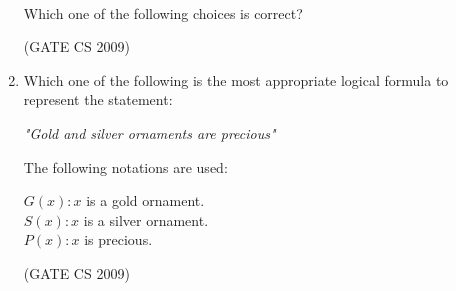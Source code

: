 \documentclass[a4paper, 11pt]{article}
\begin{document}
\begin{enumerate}
\begin{tabular}{c|cccc}
    \end{tabular}\\
    Which one of the following choices is correct?
    \begin{enumerate}
    \end{enumerate}

    \hfill (GATE CS 2009)

    \item Which one of the following is the most appropriate logical formula to represent the statement:\\
    \begin{center}
        \textit{"Gold and silver ornaments are precious"}\\
    \end{center}
    The following notations are used:\\
        \begin{center}
            $G(x): x$ is a gold ornament.\\
            $S(x): x$ is a silver ornament. \\
            $P(x): x$ is precious.\\
        \end{center}  
    \begin{enumerate}
    \end{enumerate}

    \hfill (GATE CS 2009)


\end{enumerate}
\end{document}

